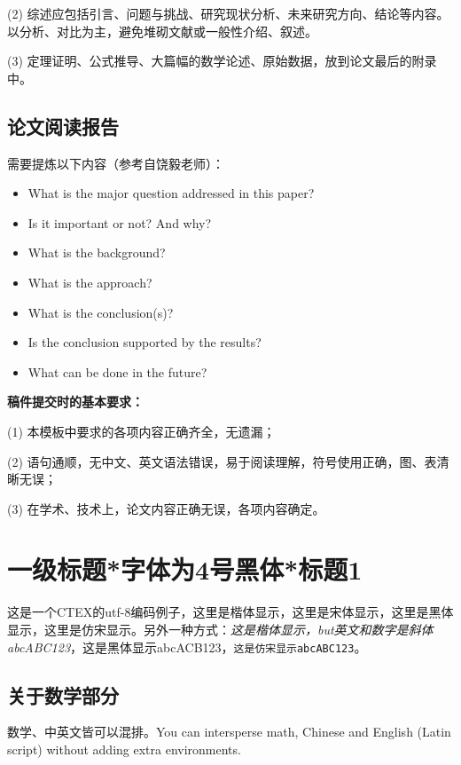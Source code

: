 \documentclass[10.5pt,compsoc,UTF8]{CjC}
\theoremstyle{mystyle}
\begin{document}
(2) 综述应包括引言、问题与挑战、研究现状分析、未来研究方向、结论等内容。以分析、对比为主，避免堆砌文献或一般性介绍、叙述。

(3) 定理证明、公式推导、大篇幅的数学论述、原始数据，放到论文最后的附录中。

\subsection{论文阅读报告}
需要提炼以下内容（参考自饶毅老师）：
\begin{itemize}
    \item What is the major question addressed in this paper?
    \item Is it important or not? And why?
    \item What is the background?
    \item What is the approach?
    \item What is the conclusion(s)?
    \item Is the conclusion supported by the results?
    \item What can be done in the future?
\end{itemize}

{\bf 稿件提交时的基本要求：}

(1) 本模板中要求的各项内容正确齐全，无遗漏；

(2) 语句通顺，无中文、英文语法错误，易于阅读理解，符号使用正确，图、表清晰无误；

(3) 在学术、技术上，论文内容正确无误，各项内容确定。








\section{\heiti 一级标题*字体为4号黑体*标题1}





这是一个CTEX的utf-8编码例子，{\kaishu 这里是楷体显示}，{\songti 这里是宋体显示}，{\heiti 这里是黑体显示}，{\fangsong 这里是仿宋显示}。另外一种方式：\textit{这是楷体显示，but英文和数字是斜体abcABC123}，\textsf{这是黑体显示abcACB123}，\texttt{这是仿宋显示abcABC123}。

\subsection{\heiti 关于数学部分}
数学、中英文皆可以混排。You can intersperse math, Chinese and English (Latin script) without adding extra environments.
\end{document}
